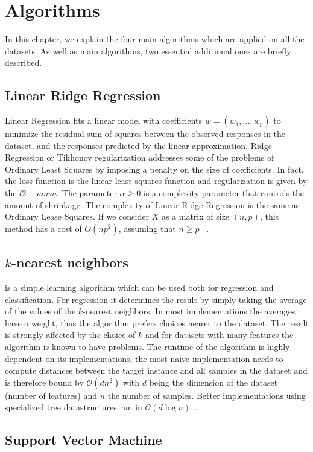 \section{Algorithms}
In this chapter, we explain the four main algorithms which are applied on all the datasets. As well as main algorithms, two essential additional ones are briefly described.

\subsection{Linear Ridge Regression}
Linear Regression fits a linear model with coefficients $w = (w_1, ..., w_p)$ to minimize the residual sum of squares between the observed responses in the dataset, and the responses predicted by the linear approximation. Ridge Regression or Tikhonov regularization addresses some of the problems of Ordinary Least Squares by imposing a penalty on the size of coefficients. In fact, the loss function is the linear least squares function and regularization is given by the $l2-norm$. The parameter $\alpha \geq 0$ is a complexity parameter that controls the amount of shrinkage. The complexity of Linear Ridge Regression is the same as Ordinary Lease Squares. If we consider $X$ as a matrix of size $(n, p)$, this method has a cost of $O(n p^2)$, assuming that $n \geq p$ ~\cite{alg:lrr}.

\subsection{$k$-nearest neighbors}
is a simple learning algorithm which can be used both for regression and classification. For regression it determines the result by simply taking the average of the values of the $k$-nearest neighbors. In most implementations the averages have a weight, thus the algorithm prefers choices nearer to the dataset. The result is strongly affected by the choice of $k$ and for datasets with many features the algorithm is known to have problems. The runtime of the algorithm is highly dependent on its implementations, the most naive implementation needs to compute distances between the target instance and all samples in the dataset and is therefore bound by $\mathcal{O}(dn^2)$ with $d$ being the dimension of the dataset (number of features) and $n$ the number of samples. Better implementations using specialized tree datastructures run in $\mathcal{O}(d\log n)$~\cite{alg:knn}.
\subsection{Support Vector Machine}

